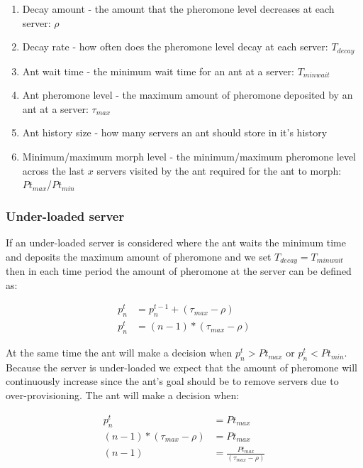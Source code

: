 \begin{enumerate}
	\item Decay amount - the amount that the pheromone level decreases at each server: $\rho$
	\item Decay rate - how often does the pheromone level decay at each server: $T_{decay}$
	\item Ant wait time - the minimum wait time for an ant at a server: $T_{minwait}$
	\item Ant pheromone level - the maximum amount of pheromone deposited by an ant at a server: $\tau_{max}$
	\item Ant history size - how many servers an ant should store in it's history
	\item Minimum/maximum morph level - the minimum/maximum pheromone level across the last $x$ servers visited by the ant required for the ant to morph: $Pt_{max}$/$Pt_{min}$
\end{enumerate}

\subsubsection{Under-loaded server}

If an under-loaded server is considered where the ant waits the minimum time and deposits the maximum amount of pheromone and we set $T_{decay} = T_{minwait}$ then in each time period the amount of pheromone at the server can be defined as:

\begin{equation}
\begin{aligned}
p^{t}_{n} &= p^{t-1}_{n} + (\tau_{max} - \rho) \\
p^{t}_{n} &= (n - 1) * (\tau_{max} - \rho)
\end{aligned}
\end{equation}

At the same time the ant will make a decision when $p^{t}_{n} > Pt_{max}$ or $p^{t}_{n} < Pt_{min}$. Because the server is under-loaded we expect that the amount of pheromone will continuously increase since the ant's goal should be to remove servers due to over-provisioning. The ant will make a decision when:

\begin{equation}
\begin{aligned}
p^{t}_{n} &= Pt_{max} \\
(n - 1) * (\tau_{max} - \rho) &= Pt_{max} \\
(n - 1) &= \frac{Pt_{max}}{(\tau_{max} - \rho)} 
\end{aligned}
\end{equation}

